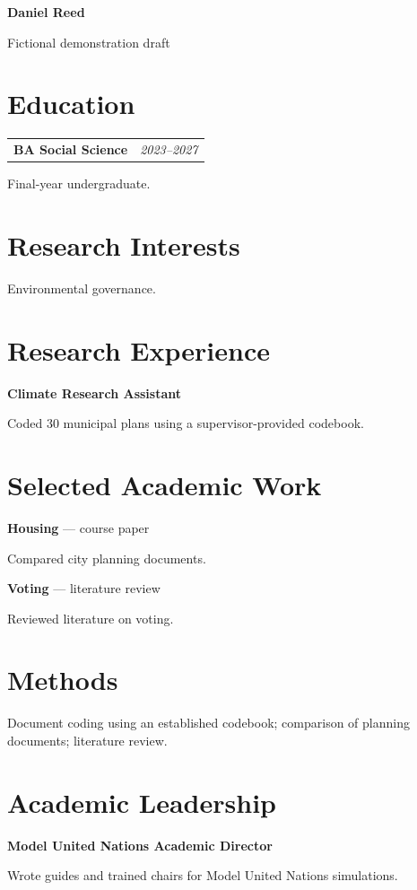 \documentclass[10pt,a4paper]{article}
\makeatletter
\newcommand{\datedline}[2]{%
  \begin{tabularx}{\textwidth}{@{}Xr@{}}
    #1 & \textit{#2}
  \end{tabularx}%
}
\newcommand{\entryspace}{\vspace{3.75pt}}
\makeatother
\begin{document}
\fontsize{10.2pt}{11.3pt}\selectfont
\begin{center}{\fontsize{19pt}{20pt}\selectfont\bfseries Daniel Reed}\par\small Fictional demonstration draft\end{center}
\section{Education}
\datedline{\textbf{BA Social Science}}{2023--2027}
Final-year undergraduate.
\section{Research Interests}
Environmental governance.
\section{Research Experience}
\textbf{Climate Research Assistant}\par
Coded 30 municipal plans using a supervisor-provided codebook.
\section{Selected Academic Work}
\textbf{Housing} --- course paper\par
Compared city planning documents.\par
\entryspace
\textbf{Voting} --- literature review\par
Reviewed literature on voting.
\section{Methods}
Document coding using an established codebook; comparison of planning documents; literature review.
\section{Academic Leadership}
\textbf{Model United Nations Academic Director}\par
Wrote guides and trained chairs for Model United Nations simulations.
\end{document}
